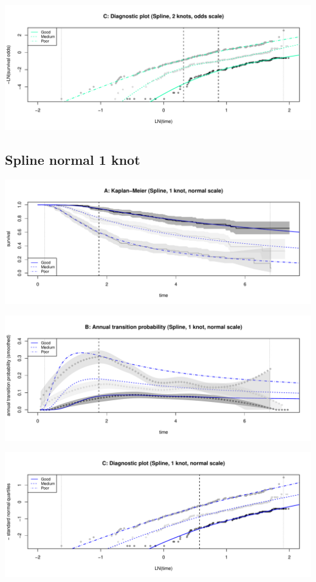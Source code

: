 \documentclass[]{article}
\begin{document}
\begin{flushleft}\includegraphics[height=0.3\textheight]{Images/spline_odds2-3} \end{flushleft}

\subsection{Spline normal 1 knot}\label{spline-normal-1-knot}

\begin{flushleft}\includegraphics[height=0.3\textheight]{Images/spline_norm1-1} \end{flushleft}

\begin{flushleft}\includegraphics[height=0.3\textheight]{Images/spline_norm1-2} \end{flushleft}

\begin{flushleft}\includegraphics[height=0.3\textheight]{Images/spline_norm1-3} \end{flushleft}
\end{document}
